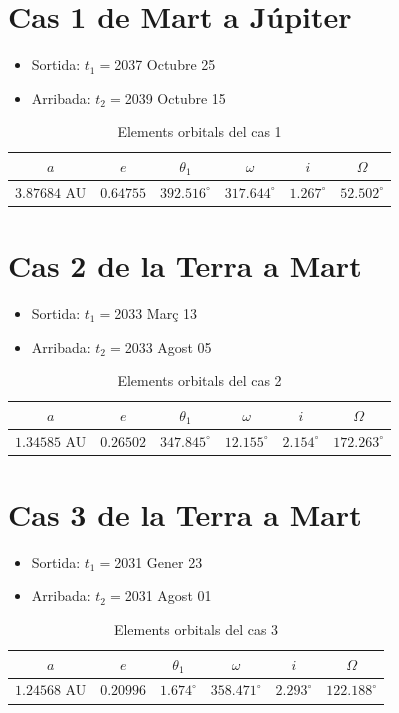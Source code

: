 \section{Cas 1 de Mart a Júpiter}
\begin{itemize}
	\item Sortida: $t_{1}=$2037 Octubre 25
	\item Arribada: $t_{2}=$2039 Octubre 15
\end{itemize}
\begin{table}[h!]
	\centering
	\begin{tabular}{ |c|c|c|c|c|c|}
		\hline
		$a$ & $e$ & $\theta_{1}$ & $\omega$ & $i$ & $\Omega$ \\ \hline
		$3.87684$ AU  & $0.64755$ & $392.516^{\circ}$ & $317.644^{\circ}$ & $1.267^{\circ}$ & $52.502^{\circ}$ \\ \hline
	\end{tabular}
	\caption{Elements orbitals del cas 1}
\end{table}

\section{Cas 2 de la Terra a Mart}
\begin{itemize}
	\item Sortida: $t_{1}=$2033 Març 13
	\item Arribada: $t_{2}=$2033 Agost 05
\end{itemize}
\begin{table}[h!]
	\centering
	\begin{tabular}{ |c|c|c|c|c|c|}
		\hline
		$a$ & $e$ & $\theta_{1}$ & $\omega$ & $i$ & $\Omega$ \\ \hline
		$1.34585$ AU  & $0.26502$ & $347.845^{\circ}$ & $12.155^{\circ}$ & $2.154^{\circ}$ & $172.263^{\circ}$ \\ \hline
	\end{tabular}
	\caption{Elements orbitals del cas 2}
\end{table}

\section{Cas 3 de la Terra a Mart}
\begin{itemize}
	\item Sortida: $t_{1}=$2031 Gener 23
	\item Arribada: $t_{2}=$2031 Agost 01
\end{itemize}
\begin{table}[h!]
	\centering
	\begin{tabular}{ |c|c|c|c|c|c|}
		\hline
		$a$ & $e$ & $\theta_{1}$ & $\omega$ & $i$ & $\Omega$ \\ \hline
		$1.24568$ AU  & $0.20996$ & $1.674^{\circ}$ & $358.471^{\circ}$ & $2.293^{\circ}$ & $122.188^{\circ}$ \\ \hline
	\end{tabular}
	\caption{Elements orbitals del cas 3}
\end{table}


